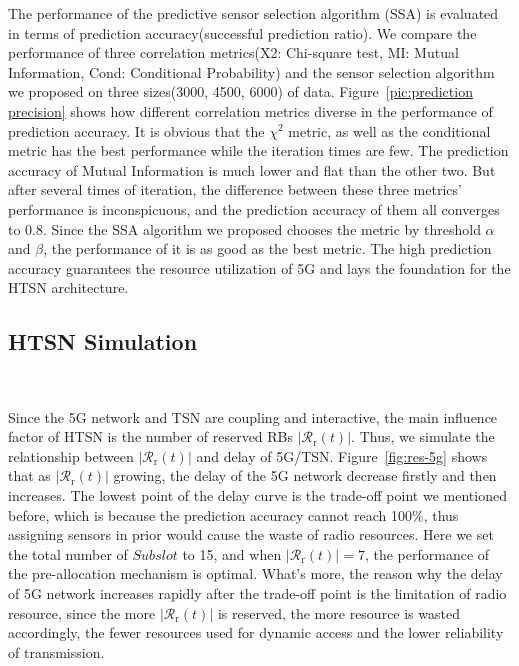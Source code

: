 \documentclass{SCIS2021}
\begin{document}
	\par  The performance of the predictive sensor selection algorithm (SSA) is evaluated in terms of prediction accuracy(successful prediction ratio). We compare the performance of three correlation metrics(X2: Chi-square test, MI: Mutual Information, Cond: Conditional Probability) and the sensor selection algorithm we proposed on three sizes(3000, 4500, 6000) of data. Figure~\ref{pic:prediction precision} shows how different correlation metrics diverse in the performance of prediction accuracy. It is obvious that the $\chi^{2}$ metric, as well as the conditional metric has the best performance while the iteration times are few. The prediction accuracy of Mutual Information is much lower and flat than the other two. But after several times of iteration, the difference between these three metrics' performance is inconspicuous, and the prediction accuracy of them all converges to 0.8. Since the SSA algorithm we proposed chooses the metric by threshold $\alpha$ and $\beta$, the performance of it is as good as the best metric. The high prediction accuracy guarantees the resource utilization of 5G and lays the foundation for the HTSN architecture.


	\subsection{HTSN Simulation}~{}
	\par Since the 5G network and TSN are coupling and interactive, the main influence factor of HTSN is the number of reserved RBs $\left|\mathcal{R}_\mathrm{r}(t)\right|$. Thus, we simulate the relationship between $\left|\mathcal{R}_\mathrm{r}(t)\right|$ and delay of 5G/TSN. Figure~\ref{fig:res-5g} shows that as $\left|\mathcal{R}_\mathrm{r}(t)\right|$ growing, the delay of the 5G network decrease firstly and then increases. The lowest point of the delay curve is the trade-off point we mentioned before, which is because the prediction accuracy cannot reach 100$\%$, thus assigning sensors in prior would cause the waste of radio resources. Here we set the total number of $Subslot$ to 15, and when $\left|\mathcal{R}_\mathrm{r}(t)\right|=7$, the performance of the pre-allocation mechanism is optimal. What's more, the reason why the delay of 5G network increases rapidly after the trade-off point is the limitation of radio resource, since the more $\left|\mathcal{R}_\mathrm{r}(t)\right|$ is reserved, the more resource is wasted accordingly, the fewer resources used for dynamic access and the lower reliability of transmission.
\end{document}
